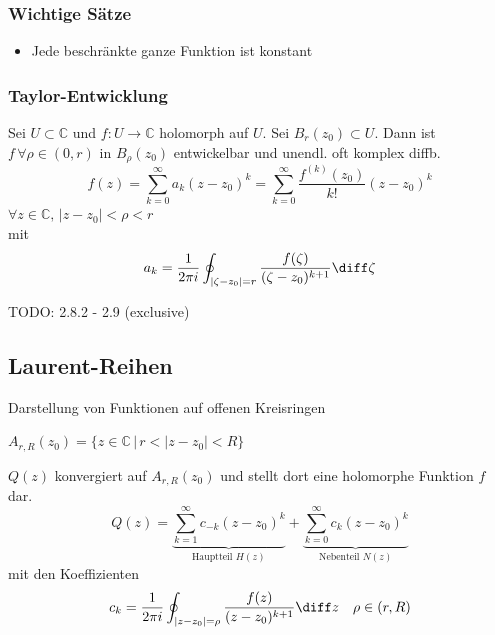 \begin{sectionbox}
    \subsubsection{Wichtige Sätze}
    \begin{itemize}
        \item Jede beschränkte ganze Funktion ist konstant
    \end{itemize}
\end{sectionbox}


\subsubsection{Taylor-Entwicklung}
\begin{emphbox}
    Sei $U\subset\mathbb C$ und $f:U\rightarrow\mathbb C$ holomorph auf $U$. Sei $B_r(z_0)\subset U$.
    Dann ist $f\, \forall\rho\in(0,r)$ in $B_\rho(z_0)$ entwickelbar und unendl. oft komplex diffb.
    \begin{equation*}
        f(z) = \sum_{k=0}^{\infty}a_k(z-z_0)^k=\sum_{k=0}^{\infty}\frac{f^{(k)}(z_0)}{k!}(z-z_0)^k
    \end{equation*}
    $\forall z\in\mathbb C, \, |z-z_0|<\rho<r$ \\
    mit
    \begin{equation*}
        a_k=\frac{1}{2\pi i}\oint_{|\zeta - z_0|=r}\frac{f(\zeta)}{(\zeta - z_0)^{k+1}}\diff\zeta
    \end{equation*}
\end{emphbox}

TODO: 2.8.2 - 2.9 (exclusive)


\subsection{Laurent-Reihen}
Darstellung von Funktionen auf offenen Kreisringen
\begin{center}
    $A_{r,R}(z_0) = \{z\in\mathbb C \, | \, r < |z-z_0| < R\}$
\end{center}

\begin{emphbox}
    $Q(z)$ konvergiert auf $A_{r,R}(z_0)$ und stellt dort eine holomorphe Funktion $f$ dar.
    \begin{equation*}
        Q(z) = \underbrace{\sum_{k=1}^{\infty}c_{-k}(z-z_0)^k}_{\text{Hauptteil } H(z)} + \underbrace{\sum_{k=0}^\infty c_k(z-z_0)^k}_{\text{Nebenteil } N(z)}
    \end{equation*}
    mit den Koeffizienten
    \begin{equation*}
        c_k=\frac{1}{2\pi i}\oint_{|z-z_0|=\rho}\frac{f(z)}{(z-z_0)^{k+1}}\diff z \quad \rho\in(r,R)
    \end{equation*}
\end{emphbox}

